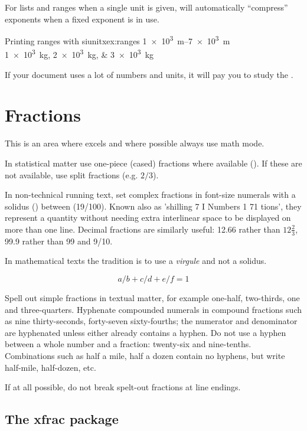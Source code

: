  For lists and ranges when a single unit is given,  will
 automatically \enquote{compress} exponents when a fixed exponent is in use.

\begin{texexample}{Printing ranges with siunitx}{ex:ranges}
  \SIrange{1e3}{7e3}{\metre} \\
  \SIlist{1e3;2e3;3e3}{\kg}
\end{texexample}

If your document uses a lot of numbers and units, it will pay you to study the .

\section{Fractions}

This is an area where \tex excels and where possible always use math mode.

In statistical matter use one-piece (cased) fractions where available (\textonehalf). If these are not available, use split fractions (e.g. $2/3$).

In non-technical running text, set complex fractions in font-size numerals
with a solidus (\thinspace\textfractionsolidus\thinspace) between (19/100). Known also as 'shilling 
7 I Numbers 1 71
tions', they represent a quantity without needing extra interlinear space
to be displayed on more than one line. Decimal fractions are similarly
useful: 12.66 rather than $12\frac{2}{3}$, 99.9 rather than 99 and 9/10.

In mathematical texts the tradition is to use a \textit{virgule} and not a solidus.

\[ a/b + c/d + e/f = 1\]

Spell out simple fractions in textual matter, for example one-half, two-thirds,
one and three-quarters. Hyphenate compounded numerals in compound
fractions such as nine thirty-seconds, forty-seven sixty-fourths; the
numerator and denominator are hyphenated unless either already contains
a hyphen. Do not use a hyphen between a whole number and a
fraction: twenty-six and nine-tenths. Combinations such as half a mile, half a
dozen contain no hyphens, but write half-mile, half-dozen, etc. 

If at all possible, do not break spelt-out fractions at line endings.

\subsection{The xfrac package}

